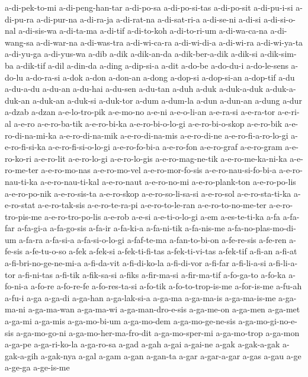 {a-di-pek-to-mi a-di-peng-han-tar a-di-po-sa a-di-po-si-tas a-di-po-sit
a-di-pu-i-si a-di-pu-ra a-di-pur-na a-di-ra-ja a-di-rat-na a-di-sat-ri-a
a-di-se-ni a-di-si a-di-si-o-nal a-di-sis-wa a-di-ta-ma a-di-tif
a-di-to-koh a-di-to-ri-um a-di-wa-ca-na a-di-wang-sa a-di-war-na
a-di-was-tra a-di-wi-ca-ra a-di-wi-di-a a-di-wi-ra a-di-wi-ya-ta
a-di-yu-ga a-di-yus-wa a-dib a-dik a-dik-an-da a-dik-ber-a-dik a-dik-si
a-dik-sim-ba a-dik-tif a-dil a-din-da a-ding a-dip-si-a a-dit a-do-be
a-do-du-i a-do-le-sens a-do-lu a-do-ra-si a-dok a-don a-don-an a-dong
a-dop-si a-dop-si-an a-dop-tif a-du a-du-a-du a-du-an a-du-hai a-du-sen
a-du-tan a-duh a-duk a-duk-a-duk a-duk-a-duk-an a-duk-an a-duk-si
a-duk-tor a-dum a-dum-la a-dun a-dun-an a-dung a-dur a-dzab a-dzan
a-e-lo-tro-pik a-e-mo-no a-e-ni a-e-o-li-an a-e-ra-si a-e-ra-tor a-e-ri-al
a-e-ro a-e-ro-ba-tik a-e-ro-bi-ka a-e-ro-bi-o-lo-gi a-e-ro-bi-o-skop
a-e-ro-bik a-e-ro-di-na-mi-ka a-e-ro-di-na-mik a-e-ro-di-na-mis
a-e-ro-di-ne a-e-ro-fi-a-ro-lo-gi a-e-ro-fi-si-ka a-e-ro-fi-si-o-lo-gi
a-e-ro-fo-bi-a a-e-ro-fon a-e-ro-graf a-e-ro-gram a-e-ro-ko-ri a-e-ro-lit
a-e-ro-lo-gi a-e-ro-lo-gis a-e-ro-mag-ne-tik a-e-ro-me-ka-ni-ka
a-e-ro-me-ter a-e-ro-mo-nas a-e-ro-mo-vel a-e-ro-mor-fo-sis
a-e-ro-nau-si-fo-bi-a a-e-ro-nau-ti-ka a-e-ro-nau-ti-kal a-e-ro-naut
a-e-ro-no-mi a-e-ro-plank-ton a-e-ro-po-lis a-e-ro-po-nik a-e-ro-sis-ta
a-e-ro-skop a-e-ro-so-li-sa-si a-e-ro-sol a-e-ro-sta-ti-ka a-e-ro-stat
a-e-ro-tak-sis a-e-ro-te-ra-pi a-e-ro-to-le-ran a-e-ro-to-no-me-ter
a-e-ro-tro-pis-me a-e-ro-tro-po-lis a-e-rob a-e-si a-e-ti-o-lo-gi a-em
a-es-te-ti-ka a-fa a-fa-far a-fa-gi-a a-fa-go-sis a-fa-ir a-fa-ki-a
a-fa-ni-tik a-fa-nis-me a-fa-no-plas-mo-di-um a-fa-ra a-fa-si-a
a-fa-si-o-lo-gi a-faf-te-ma a-fan-to-bi-on a-fe-re-sis a-fe-ren a-fe-sis
a-fe-tu-o-so a-fek a-fek-si a-fek-ti-fi-tas a-fek-ti-vi-tas a-fek-tif
a-fi-an a-fi-at a-fi-bri-no-ge-ne-mi-a a-fi-da-vit a-fi-di-ko-la
a-fi-di-vor a-fi-far a-fi-li-a-si a-fi-li-a-tor a-fi-ni-tas a-fi-tik
a-fik-sa-si a-fiks a-fir-ma-si a-fir-ma-tif a-fo-ga-to a-fo-ka a-fo-ni-a
a-fo-re a-fo-re-fe a-fo-res-ta-si a-fo-tik a-fo-to-trop-is-me a-for-is-me
a-fu-ah a-fu-i a-ga a-ga-di a-ga-han a-ga-lak-si-a a-ga-ma a-ga-ma-is
a-ga-ma-is-me a-ga-ma-ni a-ga-ma-wan a-ga-ma-wi a-ga-man-dro-e-sis
a-ga-me-on a-ga-men a-ga-met a-ga-mi a-ga-mis a-ga-mo-bi-um a-ga-mo-dem
a-ga-mo-ge-ne-sis a-ga-mo-gi-no-e-sis a-ga-mo-go-ni a-ga-mo-her-ma-fro-dit
a-ga-mo-sper-mi a-ga-mo-trop a-ga-mon a-ga-pe a-ga-ri-ko-la a-ga-ro-sa
a-gad a-gah a-gai a-gai-ne a-gak a-gak-a-gak a-gak-a-gih a-gak-nya a-gal
a-gam a-gan a-gan-ta a-gar a-gar-a-gar a-gas a-gau a-ge a-ge-ga a-ge-is-me
}
